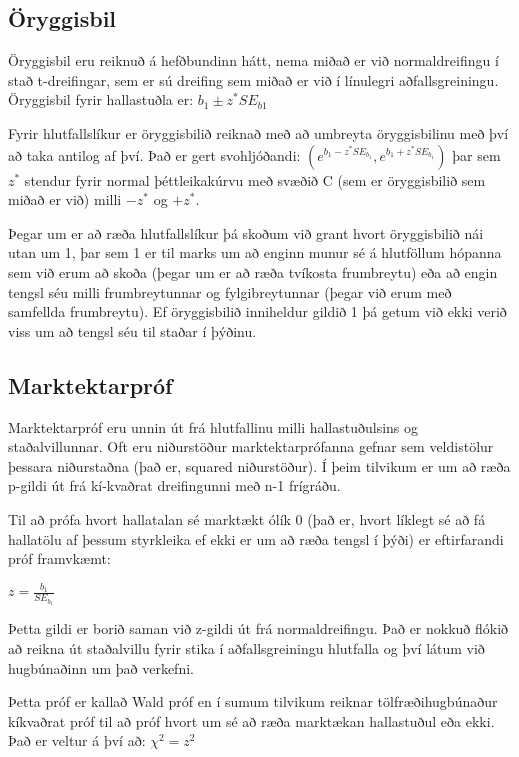 \documentclass[]{book}
\begin{document}
\hypertarget{uxf6ryggisbil}{%
\subsection{Öryggisbil}\label{uxf6ryggisbil}}

Öryggisbil eru reiknuð á hefðbundinn hátt, nema miðað er við normaldreifingu í stað t-dreifingar, sem er sú dreifing sem miðað er við í línulegri aðfallsgreiningu.
Öryggisbil fyrir hallastuðla er: \(b_{1} \pm z^\ast SE_{b1}\)

Fyrir hlutfallslíkur er öryggisbilið reiknað með að umbreyta öryggisbilinu með því að taka antilog af því. Það er gert svohljóðandi: \((e^{b_{1}-z^\ast SE_{b_{1} } }, e^{b_{1}+z^\ast SE_{b_{1} } })\) þar sem \(z^*\) stendur fyrir normal þéttleikakúrvu með svæðið C (sem er öryggisbilið sem miðað er við) milli \(-z^*\) og \(+z^*\).

Þegar um er að ræða hlutfallslíkur þá skoðum við grant hvort öryggisbilið nái utan um 1, þar sem 1 er til marks um að enginn munur sé á hlutföllum hópanna sem við erum að skoða (þegar um er að ræða tvíkosta frumbreytu) eða að engin tengsl séu milli frumbreytunnar og fylgibreytunnar (þegar við erum með samfellda frumbreytu). Ef öryggisbilið inniheldur gildið 1 þá getum við ekki verið viss um að tengsl séu til staðar í þýðinu.

\hypertarget{marktektarpruxf3f}{%
\subsection{Marktektarpróf}\label{marktektarpruxf3f}}

Marktektarpróf eru unnin út frá hlutfallinu milli hallastuðulsins og staðalvillunnar. Oft eru niðurstöður marktektarprófanna gefnar sem veldistölur þessara niðurstaðna (það er, squared niðurstöður). Í þeim tilvikum er um að ræða p-gildi út frá kí-kvaðrat dreifingunni með n-1 frígráðu.

Til að prófa hvort hallatalan sé marktækt ólík 0 (það er, hvort líklegt sé að fá hallatölu af þessum styrkleika ef ekki er um að ræða tengsl í þýði) er eftirfarandi próf framvkæmt:

\(z=\frac{b_1}{SE_{b_{1}}}\)

Þetta gildi er borið saman við z-gildi út frá normaldreifingu. Það er nokkuð flókið að reikna út staðalvillu fyrir stika í aðfallsgreiningu hlutfalla og því látum við hugbúnaðinn um það verkefni.

Þetta próf er kallað Wald próf en í sumum tilvikum reiknar tölfræðihugbúnaður kíkvaðrat próf til að próf hvort um sé að ræða marktækan hallastuðul eða ekki. Það er veltur á því að: \(\chi^2=z^2\)
\end{document}
